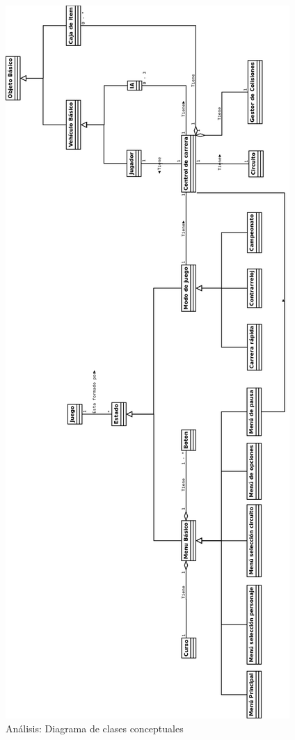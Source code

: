\begin{figure}[H]
  \label{diagrama_clases_conceptuales}
  \begin{center}
    \includegraphics[scale=0.3]{imagenes/diagrama_clases_conceptuales.png}
  \end{center}
  \caption{Análisis: Diagrama de clases conceptuales}
\end{figure}

